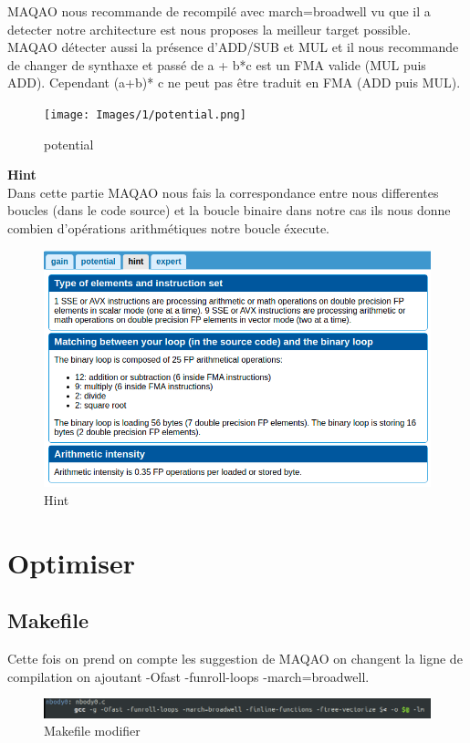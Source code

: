 \documentclass[11pt,a4paper,onecolumn,openright,oneside]{report}
\begin{document}
MAQAO nous recommande de recompilé avec march=broadwell vu que il a detecter notre architecture est nous proposes la meilleur target possible.\\

MAQAO détecter aussi la présence d'ADD/SUB et MUL et il nous recommande de changer de synthaxe et passé de a + b*c est un FMA valide (MUL puis ADD). Cependant (a+b)* c ne peut pas être traduit en FMA (ADD puis MUL).
\begin{figure}[H]
    \centering
    \texttt{[image: Images/1/potential.png]}
    \caption{potential}
    \label{fig:my_label}
\end{figure}
\newpage

\textbf{Hint}\\

Dans cette partie MAQAO nous fais la  correspondance entre nous differentes boucles (dans le code source) et la boucle binaire dans notre cas ils nous donne combien d'opérations arithmétiques notre boucle éxecute.
\begin{figure}[H]
    \centering
    \includegraphics[scale=0.5]{Images/1/Hint.png}
    \caption{Hint}
    \label{fig:my_label}
\end{figure}

\section{Optimiser}
\subsection*{Makefile}
Cette fois on prend on compte les suggestion de MAQAO on changent la ligne de compilation on ajoutant -Ofast -funroll-loops -march=broadwell.
\begin{figure}[H]
    \centering
    \includegraphics[scale=0.5]{Images/2/makefile.png}
    \caption{Makefile modifier}
    \label{fig:my_label}
\end{figure}
\end{document}
